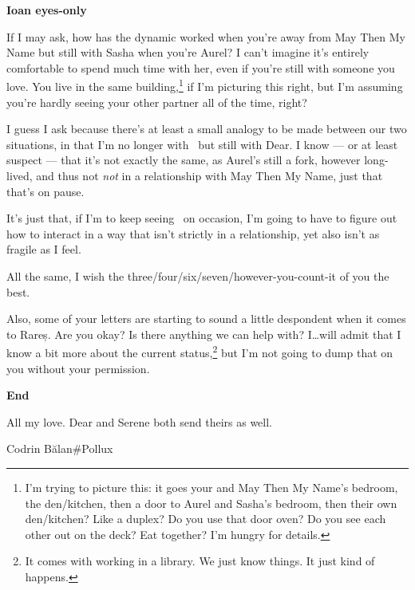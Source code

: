 \textbf{Ioan eyes-only}

If I may ask, how has the dynamic worked when you're away from May Then My Name but still with Sasha when you're Aurel? I can't imagine it's entirely comfortable to spend much time with her, even if you're still with someone you love. You live in the same building,\footnote{I'm trying to picture this: it goes your and May Then My Name's bedroom, the den/kitchen, then a door to Aurel and Sasha's bedroom, then their own den/kitchen? Like a duplex? Do you use that door oven? Do you see each other out on the deck? Eat together? I'm hungry for details.} if I'm picturing this right, but I'm assuming you're hardly seeing your other partner all of the time, right?

I guess I ask because there's at least a small analogy to be made between our two situations, in that I'm no longer with \Partner\ but still with Dear. I know — or at least suspect — that it's not exactly the same, as Aurel's still a fork, however long-lived, and thus not \emph{not} in a relationship with May Then My Name, just that that's on pause.

It's just that, if I'm to keep seeing \Partner\ on occasion, I'm going to have to figure out how to interact in a way that isn't strictly in a relationship, yet also isn't as fragile as I feel.

All the same, I wish the three/four/six/seven/however-you-count-it of you the best.

Also, some of your letters are starting to sound a little despondent when it comes to Rareș. Are you okay? Is there anything we can help with? I\ldots will admit that I know a bit more about the current status,\footnote{It comes with working in a library. We just know things. It just kind of happens.} but I'm not going to dump that on you without your permission.

\textbf{End}

All my love. Dear and Serene both send theirs as well.

Codrin Bălan\#Pollux
